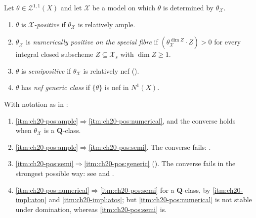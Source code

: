 \begin{definition}
\label{def:ch20-four-positivities}
Let \(\theta\in\mathcal Z^{1,1}(X)\) and let \(\mathcal X\) be a model on
which \(\theta\) is determined by \(\theta_{\mathcal X}\).
\begin{enumerate}
\item\label{itm:ch20-pos:ample} \(\theta\) is \emph{\(\mathcal X\)-positive}
 if \(\theta_{\mathcal X}\) is relatively ample.
\item\label{itm:ch20-pos:numerical} \(\theta_{\mathcal X}\) is
 \emph{numerically positive on the special fibre} if
 \((\theta_{\mathcal X}^{\dim Z}\cdot Z)>0\) for every integral closed
 subscheme \(Z\subseteq\mathcal X_s\) with \(\dim Z\geq1\).
\item\label{itm:ch20-pos:semi} \(\theta\) is \emph{semipositive} if
 \(\theta_{\mathcal X}\) is relatively nef
 ().
\item\label{itm:ch20-pos:generic} \(\theta\) has \emph{nef generic class}
 if \(\{\theta\}\) is nef in \(N^1(X)\).
\end{enumerate}
\end{definition}

\begin{theorem}
\label{thm:ch20-positivity-implications}
With notation as in :
\begin{enumerate}
\item\label{itm:ch20-impl:aton}
 \cref{itm:ch20-pos:ample}\(\Rightarrow\)\cref{itm:ch20-pos:numerical}, and
 the converse holds when \(\theta_{\mathcal X}\) is a
 \(\mathbf Q\)-class.
\item\label{itm:ch20-impl:atos}
 \cref{itm:ch20-pos:ample}\(\Rightarrow\)\cref{itm:ch20-pos:semi}.  The
 converse fails: .
\item\label{itm:ch20-impl:stog}
 \cref{itm:ch20-pos:semi}\(\Rightarrow\)\cref{itm:ch20-pos:generic}
 \textup{()}.  The converse fails
 in the strongest possible way: see
  and
 .
\item\label{itm:ch20-impl:ntos}
 \cref{itm:ch20-pos:numerical}\(\Rightarrow\)\cref{itm:ch20-pos:semi}
 for a \(\mathbf Q\)-class, by \cref{itm:ch20-impl:aton} and
 \cref{itm:ch20-impl:atos}; but \cref{itm:ch20-pos:numerical} is not stable
 under domination, whereas \cref{itm:ch20-pos:semi} is.
\end{enumerate}
\end{theorem}

